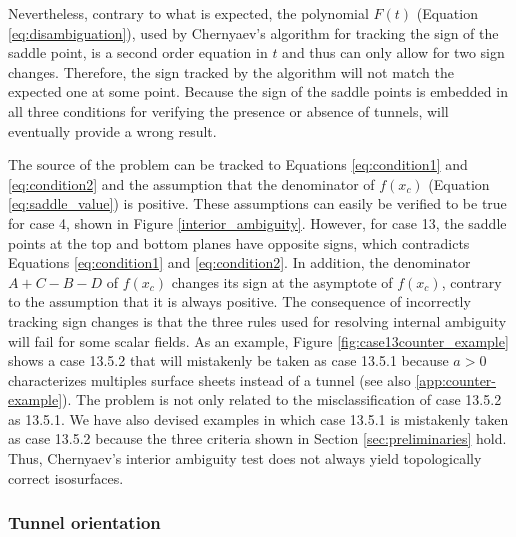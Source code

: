 Nevertheless, contrary to what is expected, the polynomial $F(t)$ (Equation \eqref{eq:disambiguation}), used by Chernyaev's \mc{} algorithm for tracking the sign of the saddle point, is a second order equation in $t$ and thus can only allow for two sign changes. Therefore, the sign tracked by the \mc{} algorithm will not match the expected one at some point. Because the sign of the saddle points is embedded in all three  conditions for verifying the presence or absence of tunnels, \mc{} will eventually provide a wrong result.

The source of the problem can be tracked to Equations \ref{eq:condition1} and \ref{eq:condition2} and the assumption that the denominator of $f(x_c)$ (Equation \eqref{eq:saddle_value}) is positive. 
These assumptions can easily be verified to be true for case 4, shown in Figure \ref{interior_ambiguity}. However, for case 13, the saddle points at the top and bottom planes have opposite signs, which contradicts Equations \eqref{eq:condition1} and \eqref{eq:condition2}. In addition, the denominator $A+C-B-D$ of $f(x_c)$ changes its sign at the asymptote of $f(x_c)$, contrary to the assumption that it is always positive.
%
The consequence of incorrectly tracking sign changes is that the three rules used for resolving internal ambiguity will fail for some scalar fields. As an example, Figure \ref{fig:case13counter_example} shows a case 13.5.2 that will mistakenly be taken as case 13.5.1 because  $a > 0$ characterizes multiples surface sheets instead of a tunnel (see also \ref{app:counter-example}).
%
The problem is not only related to the misclassification of case 13.5.2 as 13.5.1. We have also devised examples in which case 13.5.1 is mistakenly taken as case 13.5.2 because the three criteria shown in Section \ref{sec:preliminaries} hold. Thus, Chernyaev's interior ambiguity test does not always yield topologically correct isosurfaces.

\subsubsection{Tunnel orientation}


